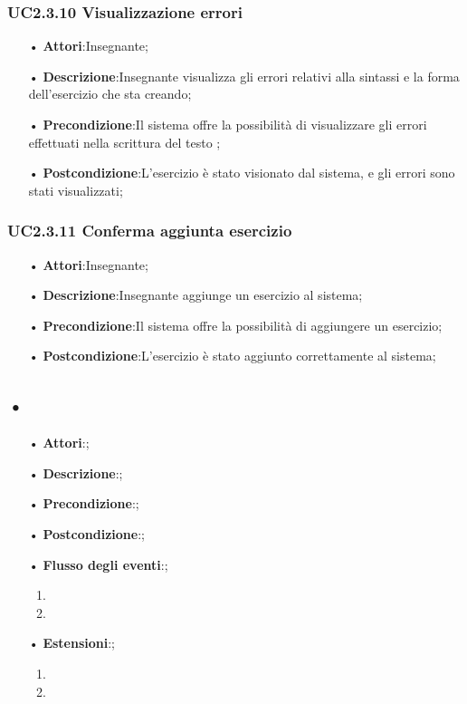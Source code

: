 \subsubsection{UC2.3.10 Visualizzazione errori}
\begin{itemize}
	\item[•] \textbf{Attori}:Insegnante;
	\item[•] \textbf{Descrizione}:Insegnante visualizza gli errori relativi alla sintassi e la forma dell’esercizio che sta creando;
	\item[•] \textbf{Precondizione}:Il sistema offre la possibilità di visualizzare gli errori effettuati nella scrittura del testo ;
	\item[•] \textbf{Postcondizione}:L’esercizio è stato visionato dal sistema, e gli errori sono stati visualizzati;
\end{itemize}

\subsubsection{UC2.3.11 Conferma aggiunta esercizio}
\begin{itemize}
	\item[•] \textbf{Attori}:Insegnante;
	\item[•] \textbf{Descrizione}:Insegnante aggiunge un esercizio al sistema;
	\item[•] \textbf{Precondizione}:Il sistema offre la possibilità di aggiungere un esercizio;
	\item[•] \textbf{Postcondizione}:L’esercizio è stato aggiunto correttamente al sistema;
\end{itemize}

\subsection{•}
\begin{itemize}
	\item[•] \textbf{Attori}:;
	\item[•] \textbf{Descrizione}:;
	\item[•] \textbf{Precondizione}:;
	\item[•] \textbf{Postcondizione}:;
	\item[•] \textbf{Flusso degli eventi}:;
	\begin{enumerate}
		\item
		\item
	\end{enumerate}
	\item[•] \textbf{Estensioni}:;	
	\begin{enumerate}
		\item
		\item
	\end{enumerate}
\end{itemize}






